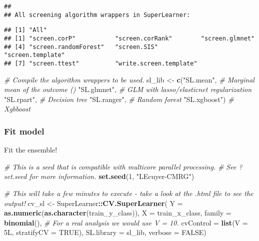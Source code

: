 \documentclass[
]{book}
\newenvironment{Shaded}{\begin{snugshade}}{\end{snugshade}}
\newcommand{\CommentTok}[1]{\textcolor[rgb]{0.56,0.35,0.01}{\textit{#1}}}
\newcommand{\DataTypeTok}[1]{\textcolor[rgb]{0.13,0.29,0.53}{#1}}
\newcommand{\DecValTok}[1]{\textcolor[rgb]{0.00,0.00,0.81}{#1}}
\newcommand{\KeywordTok}[1]{\textcolor[rgb]{0.13,0.29,0.53}{\textbf{#1}}}
\newcommand{\NormalTok}[1]{#1}
\newcommand{\OperatorTok}[1]{\textcolor[rgb]{0.81,0.36,0.00}{\textbf{#1}}}
\newcommand{\OtherTok}[1]{\textcolor[rgb]{0.56,0.35,0.01}{#1}}
\newcommand{\StringTok}[1]{\textcolor[rgb]{0.31,0.60,0.02}{#1}}
\begin{document}
\begin{verbatim}
## 
## All screening algorithm wrappers in SuperLearner:
\end{verbatim}

\begin{verbatim}
## [1] "All"
## [1] "screen.corP"           "screen.corRank"        "screen.glmnet"        
## [4] "screen.randomForest"   "screen.SIS"            "screen.template"      
## [7] "screen.ttest"          "write.screen.template"
\end{verbatim}

\begin{Shaded}
\begin{Highlighting}[]
\CommentTok{\# Compile the algorithm wrappers to be used.}
\NormalTok{sl\_lib \textless{}{-}}\StringTok{ }\KeywordTok{c}\NormalTok{(}\StringTok{"SL.mean"}\NormalTok{, }\CommentTok{\# Marginal mean of the outcome () }
            \StringTok{"SL.glmnet"}\NormalTok{, }\CommentTok{\# GLM with lasso/elasticnet regularization }
            \StringTok{"SL.rpart"}\NormalTok{, }\CommentTok{\# Decision tree }
            \StringTok{"SL.ranger"}\NormalTok{, }\CommentTok{\# Random forest  }
            \StringTok{"SL.xgboost"}\NormalTok{) }\CommentTok{\# Xgbboost }
\end{Highlighting}
\end{Shaded}

\hypertarget{fit-model}{%
\subsubsection{Fit model}\label{fit-model}}

Fit the ensemble!

\begin{Shaded}
\begin{Highlighting}[]
\CommentTok{\# This is a seed that is compatible with multicore parallel processing.}
\CommentTok{\# See ?set.seed for more information.}
\KeywordTok{set.seed}\NormalTok{(}\DecValTok{1}\NormalTok{, }\StringTok{"L\textquotesingle{}Ecuyer{-}CMRG"}\NormalTok{) }

\CommentTok{\# This will take a few minutes to execute {-} take a look at the .html file to see the output!}
\NormalTok{cv\_sl \textless{}{-}}\StringTok{  }\NormalTok{SuperLearner}\OperatorTok{::}\KeywordTok{CV.SuperLearner}\NormalTok{(}
  \DataTypeTok{Y =} \KeywordTok{as.numeric}\NormalTok{(}\KeywordTok{as.character}\NormalTok{(train\_y\_class)),}
  \DataTypeTok{X =}\NormalTok{ train\_x\_class,}
  \DataTypeTok{family =} \KeywordTok{binomial}\NormalTok{(),}
  \CommentTok{\# For a real analysis we would use V = 10.}
  \DataTypeTok{cvControl =} \KeywordTok{list}\NormalTok{(}\DataTypeTok{V =}\NormalTok{ 5L, }\DataTypeTok{stratifyCV =} \OtherTok{TRUE}\NormalTok{),}
  \DataTypeTok{SL.library =}\NormalTok{ sl\_lib,}
  \DataTypeTok{verbose =} \OtherTok{FALSE}\NormalTok{)}
\end{Highlighting}
\end{Shaded}
\end{document}
